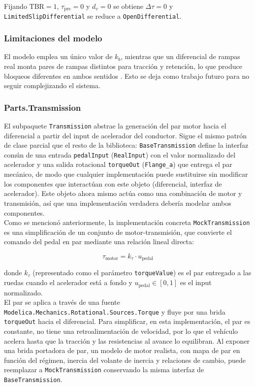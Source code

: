 Fijando $\text{TBR} = 1$, $\tau_\text{pre} = 0$ y $d_v = 0$ se obtiene $\Delta\tau = 0$ y \verb|LimitedSlipDifferential| se reduce a \verb|OpenDifferential|.\\


\subsubsection{Limitaciones del modelo}

El modelo emplea un único valor de $k_b$, mientras que un diferencial de rampas real monta pares de rampas distintos para tracción y retención, lo que produce bloqueos diferentes en ambos sentidos  \cite{gadola2021}. Esto se deja como trabajo futuro para no seguir complejizando el sistema.



\subsubsection*{Parts.Transmission}


El subpaquete \verb|Transmission| abstrae la generación del par motor hacia el diferencial a partir del input de acelerador del conductor. Sigue el mismo patrón de clase parcial que el resto de la biblioteca: \verb|BaseTransmission| define la interfaz común de una entrada \verb|pedalInput| (\verb|RealInput|) con el valor normalizado del acelerador y una salida rotacional \verb|torqueOut| (\verb|Flange_a|) que entrega el par mecánico, de modo que cualquier implementación puede sustituirse sin modificar los componentes que interactúan con este objeto (diferencial, interfaz de acelerador). Este objeto ahora mismo actúa como una combinación de motor y transmisión, así que una implementación verdadera debería modelar ambos componentes.\\

Como se mencionó anteriormente, la implementación concreta \verb|MockTransmission| es una simplificación de un conjunto de motor-transmisión, que convierte el comando del pedal en par mediante una relación lineal directa:

\begin{equation}
    \tau_\text{motor} = k_\tau \cdot u_\text{pedal}
\end{equation}

donde $k_\tau$ (representado como el parámetro \verb|torqueValue|) es el par entregado a las ruedas cuando el acelerador está a fondo y  $u_\text{pedal} \in [0, 1]$ es el input normalizado. \\ 
El par se aplica a través de una fuente \verb|Modelica.Mechanics.Rotational.Sources.Torque| y fluye por una brida \verb|torqueOut| hacia el diferencial. Para simplificar, en esta implementación, el par es constante, no tiene una retroalimentación de velocidad, por lo que el vehículo acelera hasta que la tracción y las resistencias al avance lo equilibran. Al exponer una brida portadora de par, un modelo de motor realista, con mapa de par en función del régimen, inercia del volante de inercia y relaciones de cambio, puede reemplazar a \verb|MockTransmission| conservando la misma interfaz de \verb|BaseTransmission|.\\


